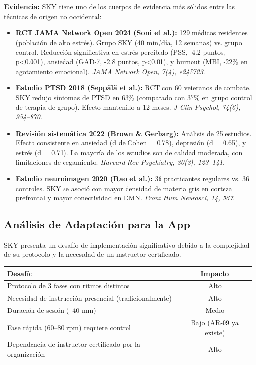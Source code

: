 \documentclass[12pt,a4paper]{article}
\newcommand{\evidencia}[1]{\textbf{Evidencia:} #1}
\begin{document}
\evidencia{SKY tiene uno de los cuerpos de evidencia más sólidos entre las
técnicas de origen no occidental:}

\begin{itemize}
    \item \textbf{RCT JAMA Network Open 2024 (Soni et al.):}
          129 médicos residentes (población de alto estrés). Grupo SKY (40
          min/día, 12 semanas) vs. grupo control. Reducción significativa en
          estrés percibido (PSS, -4.2 puntos, p<0.001), ansiedad (GAD-7,
          -2.8 puntos, p<0.01), y burnout (MBI, -22\% en agotamiento
          emocional). \textit{JAMA Network Open, 7(4), e245723}.
    \item \textbf{Estudio PTSD 2018 (Seppälä et al.):}
          RCT con 60 veteranos de combate. SKY redujo síntomas de PTSD en
          63\% (comparado con 37\% en grupo control de terapia de grupo).
          Efecto mantenido a 12 meses. \textit{J Clin Psychol, 74(6),
          954--970}.
    \item \textbf{Revisión sistemática 2022 (Brown \& Gerbarg):}
          Análisis de 25 estudios. Efecto consistente en ansiedad (d de
          Cohen = 0.78), depresión (d = 0.65), y estrés (d = 0.71). La
          mayoría de los estudios son de calidad moderada, con limitaciones
          de cegamiento. \textit{Harvard Rev Psychiatry, 30(3), 123--141}.
    \item \textbf{Estudio neuroimagen 2020 (Rao et al.):}
          36 practicantes regulares vs. 36 controles. SKY se asoció con
          mayor densidad de materia gris en corteza prefrontal y mayor
          conectividad en DMN. \textit{Front Hum Neurosci, 14, 567}.
\end{itemize}

\subsection{Análisis de Adaptación para la App}

SKY presenta un desafío de implementación significativo debido a la
complejidad de su protocolo y la necesidad de un instructor certificado.

\begin{tabularx}{\textwidth}{Xc}
    \toprule
    \textbf{Desafío} & \textbf{Impacto} \\
    \midrule
    Protocolo de 3 fases con ritmos distintos & Alto \\
    Necesidad de instrucción presencial (tradicionalmente) & Alto \\
    Duración de sesión (~40 min) & Medio \\
    Fase rápida (60--80 rpm) requiere control & Bajo (AR-09 ya existe) \\
    Dependencia de instructor certificado por la organización & Alto \\
    \bottomrule
\end{tabularx}
\end{document}
